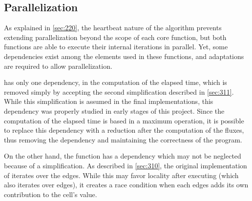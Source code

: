 \subsection{Parallelization}

As explained in \cref{sec:220}, the heartbeat nature of the algorithm prevents extending parallelization beyond the scope of each core function, but both functions are able to execute their internal iterations in parallel. Yet, some dependencies exist among the elements used in these functions, and adaptations are required to allow parallelization.


\computeflux has only one dependency, in the computation of the elapsed time, which is removed simply by accepting the second simplification described in \cref{sec:311}. While this simplification is assumed in the final implementations, this dependency was properly studied in early stages of this project. Since the computation of the elapsed time is based in a maximum operation, it is possible to replace this dependency with a reduction after the computation of the fluxes, thus removing the dependency and maintaining the correctness of the program.

On the other hand, the \update function has a dependency which may not be neglected because of a simplification. As described in \cref{sec:310}, the original implementation of \update iterates over the edges. While this may favor locality after executing \computeflux (which also iterates over edges), it creates a race condition when each edges adds its own contribution to the cell's value.